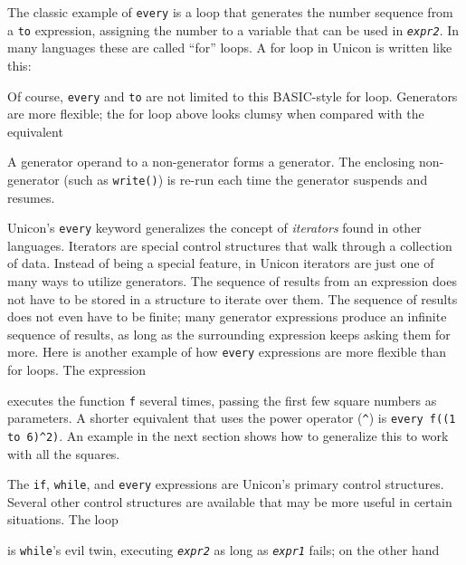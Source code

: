 The classic example of \texttt{every} is a loop that generates the number
sequence from a \texttt{to} expression, assigning the number to a variable that
can be used in \texttt{\textit{expr2}}. In many languages these are called
``for'' loops. A for loop in Unicon is written like this:

\noindent
Of course, \texttt{every} and \texttt{to} are not limited to this BASIC-style
for loop. Generators are more flexible; the for loop
above looks clumsy when compared with the equivalent


\noindent
A generator operand to a non-generator forms a generator. The enclosing
non-generator (such as \texttt{write()}) is re-run each time
the generator suspends and resumes.

Unicon's \texttt{every} keyword generalizes the concept of
\textit{iterators} found in other languages.  Iterators are
special control structures that walk through a collection of data. Instead of
being a special feature, in Unicon iterators are just one of many ways to
utilize generators. The sequence of results from an
expression does not have to be stored in a structure to iterate over them. The
sequence of results does not even have to be finite; many
generator expressions produce an infinite sequence of results,
as long as the surrounding expression keeps asking them for more. Here is
another example of how \texttt{every} expressions are more flexible than for
loops. The expression


\noindent
executes the function \texttt{f} several times, passing the first few
square numbers as parameters. A shorter equivalent that uses the power
operator (\texttt{\^{}}) is \texttt{every f((1 to 6)\^{}2)}. An example
in the next section shows how to generalize this to work with all the
squares.

The \texttt{if}, \texttt{while}, and \texttt{every} expressions are
Unicon's primary control structures. Several other
control structures are available that may be more useful in certain
situations. The loop


\noindent is \texttt{while}'s evil twin, executing
\texttt{\textit{expr2}} as long as \texttt{\textit{expr1}}
fails; on the other hand


